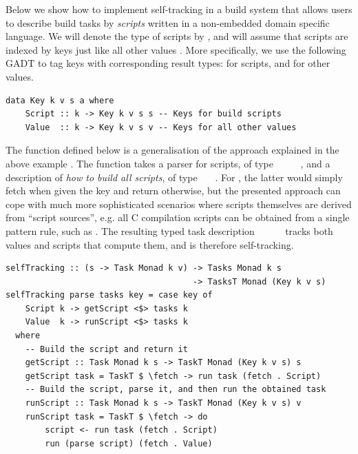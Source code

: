 Below we show how to implement self-tracking in a build system that allows users
to describe build tasks by \emph{scripts} written in a non-embedded domain
specific language. We will denote the type of scripts by , and will assume
that scripts are indexed by keys  just like all other values . More
specifically, we use the following GADT to tag keys  with corresponding
result types:  for scripts, and  for other values.

\vspace{1mm}
\begin{verbatim}
data Key k v s a where
    Script :: k -> Key k v s s -- Keys for build scripts
    Value  :: k -> Key k v s v -- Keys for all other values
\end{verbatim}
\vspace{1mm}

\noindent
The function  defined below is a generalisation of the approach
explained in the above \Excel example . The function takes a parser
for scripts, of type ~\hs{->}~~~~, and a
description of \emph{how to build all scripts}, of type
~~~. For , the latter would simply
fetch  when given the key  and return 
otherwise, but the presented approach can cope with much more sophisticated
scenarios where scripts themselves are derived from ``script sources'', e.g. all
C compilation scripts can be obtained from a single pattern rule, such as
. The resulting typed task description
~~~~~ tracks both values and
scripts that compute them, and is therefore self-tracking.

\vspace{1mm}
\begin{verbatim}
selfTracking :: (s -> Task Monad k v) -> Tasks Monad k s
                                      -> TasksT Monad (Key k v s)
selfTracking parse tasks key = case key of
    Script k -> getScript <$> tasks k
    Value  k -> runScript <$> tasks k
  where
    -- Build the script and return it
    getScript :: Task Monad k s -> TaskT Monad (Key k v s) s
    getScript task = TaskT $ \fetch -> run task (fetch . Script)
    -- Build the script, parse it, and then run the obtained task
    runScript :: Task Monad k s -> TaskT Monad (Key k v s) v
    runScript task = TaskT $ \fetch -> do
        script <- run task (fetch . Script)
        run (parse script) (fetch . Value)
\end{verbatim}
\vspace{1mm}

